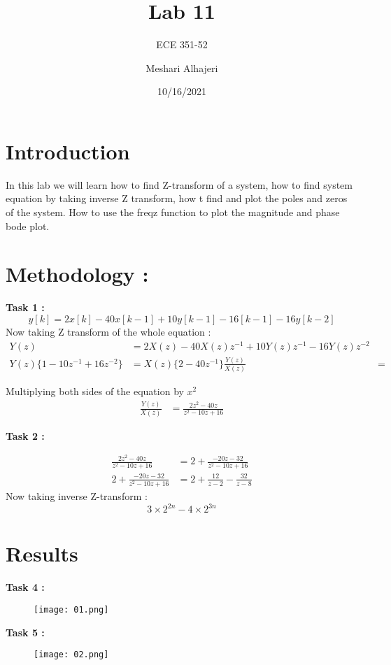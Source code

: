 \documentclass{article}
\title{Lab 11}
\author{ECE 351-52}
\author{Meshari Alhajeri}
\date{10/16/2021}
\begin{document}
\maketitle

\section{Introduction}
In this lab we will learn how to find Z-transform of a system, how to find system equation by taking inverse Z transform, how t find and plot the poles and zeros of the system. How to use the freqz function to plot the magnitude and phase bode plot. 




\section{Methodology :}
\textbf{Task 1 :}
$$ y[k] = 2x[k]-40x[k-1]+10y[k-1]-16[k-1]-16y[k-2] $$
Now taking Z transform of the whole equation :
\begin{align*}
Y(z) & = 2X(z)-40X(z)z^{-1}+10Y(z)z^{-1}-16Y(z)z^{-2}
\\ Y(z)\{1-10z^{-1}+16z^{-2} \} & = X(z)\{2-40z^{-1} \}
\frac{Y(z)}{X(z)} &=
\end{align*}

Multiplying both sides of the equation by $x^2$
\begin{align*}
\frac{Y(z)}{X(z)} &=\frac{2z^{2}-40z}{z^2-10z+16}
\end{align*}

\textbf{Task 2 :}

\begin{align*}
\frac{2z^2-40z}{z^2-10z+16} &= 2+\frac{-20z-32}{z^2-10z+16}
\\ 2+\frac{-20z-32}{z^2-10z+16} &= 2+\frac{12}{z-2}-\frac{32}{z-8}
\end{align*}
Now taking inverse Z-transform :
$$3\times 2^{2n} - 4\times 2^{3n} $$










\section{Results}

\textbf{Task 4 :}
\begin{figure}[H]
\centering
\texttt{[image: 01.png]}
\label{fig:my_label}
\end{figure}
\textbf{Task 5 :}
\begin{figure}[H]
\centering
\texttt{[image: 02.png]}
\label{fig:my_label}
\end{figure}
\end{document}
